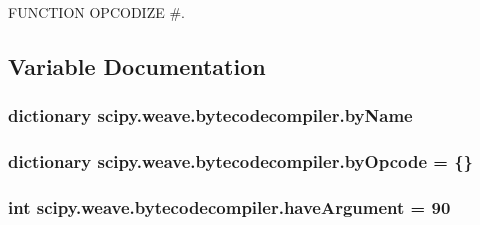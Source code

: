 F\+U\+N\+C\+T\+I\+O\+N O\+P\+C\+O\+D\+I\+Z\+E \#. 



\subsection{Variable Documentation}
\hypertarget{namespacescipy_1_1weave_1_1bytecodecompiler_acb5d67924eacf2fc4d722ec3d32753a8}{}
\subsubsection[{by\+Name}]{\setlength{\rightskip}{0pt plus 5cm}dictionary scipy.\+weave.\+bytecodecompiler.\+by\+Name}\label{namespacescipy_1_1weave_1_1bytecodecompiler_acb5d67924eacf2fc4d722ec3d32753a8}
\hypertarget{namespacescipy_1_1weave_1_1bytecodecompiler_a3da90dd77a9bb0fbf64c541ad5be1260}{}
\subsubsection[{by\+Opcode}]{\setlength{\rightskip}{0pt plus 5cm}dictionary scipy.\+weave.\+bytecodecompiler.\+by\+Opcode = \{\}}\label{namespacescipy_1_1weave_1_1bytecodecompiler_a3da90dd77a9bb0fbf64c541ad5be1260}
\hypertarget{namespacescipy_1_1weave_1_1bytecodecompiler_a9627b8bab02ca58dc8e69adf52731790}{}
\subsubsection[{have\+Argument}]{\setlength{\rightskip}{0pt plus 5cm}int scipy.\+weave.\+bytecodecompiler.\+have\+Argument = 90}\label{namespacescipy_1_1weave_1_1bytecodecompiler_a9627b8bab02ca58dc8e69adf52731790}
